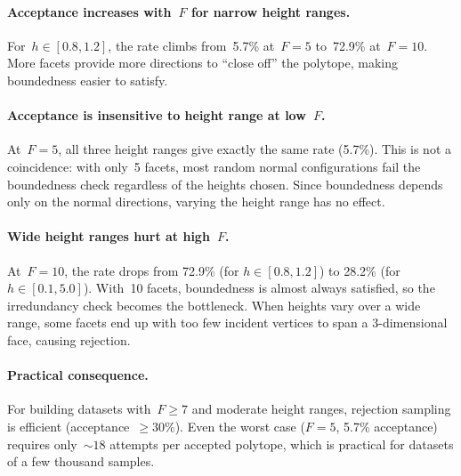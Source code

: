 \paragraph{Acceptance increases with~$F$ for narrow height ranges.}
For~$h \in [0.8, 1.2]$, the rate climbs from~5.7\% at~$F = 5$ to~72.9\%
at~$F = 10$. More facets provide more directions to ``close off'' the
polytope, making boundedness easier to satisfy.

\paragraph{Acceptance is insensitive to height range at low~$F$.}
At~$F = 5$, all three height ranges give exactly the same rate (5.7\%).
This is not a coincidence: with only~5 facets, most random normal
configurations fail the boundedness check regardless of the heights chosen.
Since boundedness depends only on the normal directions, varying the height
range has no effect.

\paragraph{Wide height ranges hurt at high~$F$.}
At~$F = 10$, the rate drops from 72.9\% (for $h \in [0.8, 1.2]$) to 28.2\%
(for $h \in [0.1, 5.0]$). With~10 facets, boundedness is almost always
satisfied, so the irredundancy check becomes the bottleneck. When heights vary
over a wide range, some facets end up with too few incident vertices to span
a 3-dimensional face, causing rejection.

\paragraph{Practical consequence.}
For building datasets with~$F \ge 7$ and moderate height ranges, rejection
sampling is efficient (acceptance~$\ge 30\%$). Even the worst case ($F = 5$,
5.7\% acceptance) requires only~${\sim}18$ attempts per accepted polytope,
which is practical for datasets of a few thousand samples.
